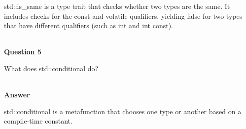 std::is\_same is a type trait that checks whether two types are the same. It includes checks for the const and volatile qualifiers, yielding false for two types that have different qualifiers (such as int and int const).

\hspace*{\fill} \\ %
\noindent
\textbf{Question 5}

What does std::conditional do?

\hspace*{\fill} \\ %
\noindent
\textbf{Answer}

std::conditional is a metafunction that chooses one type or another based on a compile-time constant.












